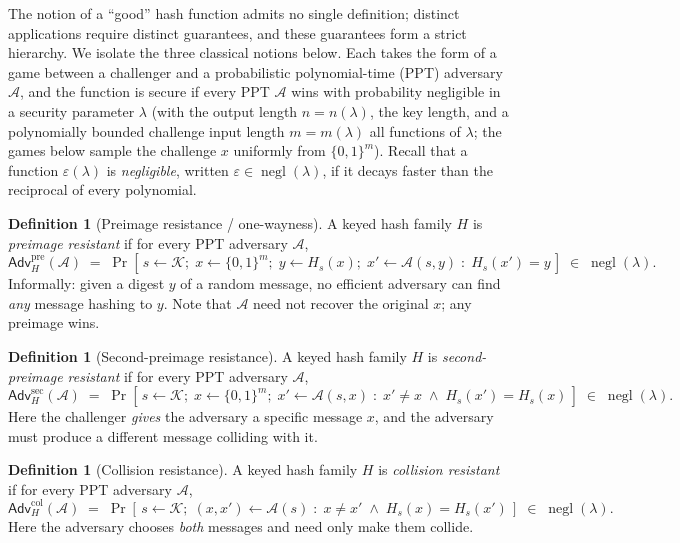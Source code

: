 \documentclass[11pt,a4paper]{article}
\theoremstyle{definition}
\newtheorem{definition}[theorem]{Definition}
\theoremstyle{remark}
\DeclareMathOperator{\negl}{negl}
\begin{document}
The notion of a ``good'' hash function admits no single definition; distinct applications require distinct guarantees, and these guarantees form a strict hierarchy. We isolate the three classical notions below. Each takes the form of a game between a challenger and a probabilistic polynomial-time (PPT) adversary \(\mathcal{A}\), and the function is secure if every PPT \(\mathcal{A}\) wins with probability negligible in a security parameter \(\lambda\) (with the output length \(n = n(\lambda)\), the key length, and a polynomially bounded challenge input length \(m = m(\lambda)\) all functions of \(\lambda\); the games below sample the challenge \(x\) uniformly from \(\{0,1\}^{m}\)). Recall that a function \(\varepsilon(\lambda)\) is \emph{negligible}, written \(\varepsilon \in \negl(\lambda)\), if it decays faster than the reciprocal of every polynomial.

\begin{definition}[Preimage resistance / one-wayness]\label{hash:def:preimage}
A keyed hash family \(H\) is \emph{preimage resistant} if for every PPT adversary \(\mathcal{A}\),
\[
  \mathsf{Adv}^{\mathrm{pre}}_{H}(\mathcal{A})
  \;=\;
  \Pr\!\left[\,
    s \leftarrow \mathcal{K};\;
    x \leftarrow \{0,1\}^{m};\;
    y \leftarrow H_{s}(x);\;
    x' \leftarrow \mathcal{A}(s,y)
    \;:\;
    H_{s}(x') = y
  \,\right]
  \;\in\; \negl(\lambda).
\]
Informally: given a digest \(y\) of a random message, no efficient adversary can find \emph{any} message hashing to \(y\). Note that \(\mathcal{A}\) need not recover the original \(x\); any preimage wins.
\end{definition}

\begin{definition}[Second-preimage resistance]\label{hash:def:secondpre}
A keyed hash family \(H\) is \emph{second-preimage resistant} if for every PPT adversary \(\mathcal{A}\),
\[
  \mathsf{Adv}^{\mathrm{sec}}_{H}(\mathcal{A})
  \;=\;
  \Pr\!\left[\,
    s \leftarrow \mathcal{K};\;
    x \leftarrow \{0,1\}^{m};\;
    x' \leftarrow \mathcal{A}(s,x)
    \;:\;
    x' \neq x \;\wedge\; H_{s}(x') = H_{s}(x)
  \,\right]
  \;\in\; \negl(\lambda).
\]
Here the challenger \emph{gives} the adversary a specific message \(x\), and the adversary must produce a different message colliding with it.
\end{definition}

\begin{definition}[Collision resistance]\label{hash:def:collision}
A keyed hash family \(H\) is \emph{collision resistant} if for every PPT adversary \(\mathcal{A}\),
\[
  \mathsf{Adv}^{\mathrm{col}}_{H}(\mathcal{A})
  \;=\;
  \Pr\!\left[\,
    s \leftarrow \mathcal{K};\;
    (x, x') \leftarrow \mathcal{A}(s)
    \;:\;
    x \neq x' \;\wedge\; H_{s}(x) = H_{s}(x')
  \,\right]
  \;\in\; \negl(\lambda).
\]
Here the adversary chooses \emph{both} messages and need only make them collide.
\end{definition}
\end{document}
